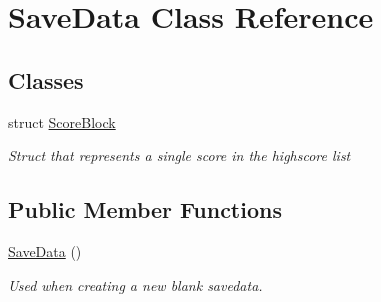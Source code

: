 \hypertarget{class_save_data}{}\section{Save\+Data Class Reference}
\label{class_save_data}
\subsection*{Classes}
\begin{DoxyCompactItemize}
\item 
struct \hyperlink{struct_save_data_1_1_score_block}{Score\+Block}
\begin{DoxyCompactList}\small\item\em Struct that represents a single score in the highscore list \end{DoxyCompactList}\end{DoxyCompactItemize}
\subsection*{Public Member Functions}
\begin{DoxyCompactItemize}
\item 
\hyperlink{class_save_data_a2da03a58cf0deb69ccd73c938780df3d}{Save\+Data} ()
\begin{DoxyCompactList}\small\item\em Used when creating a new blank savedata. \end{DoxyCompactList}\end{DoxyCompactItemize}
